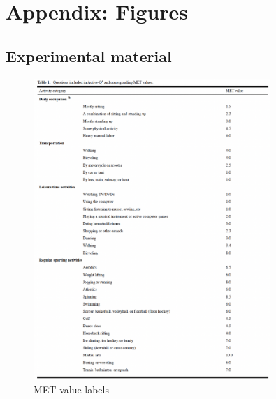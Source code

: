 \chapter*{Appendix: Figures}

\section*{Experimental material}
\begin{figure}[ht]
    \centering
    \includegraphics[width=0.8\textwidth]{appendix/met_values.png}
    \caption{MET value labels \parencite{Bonn_2012}}
    \label{fig: met_values}
\end{figure}
